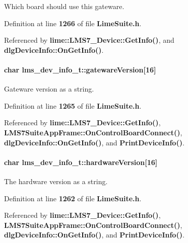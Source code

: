 Which board should use this gateware. 



Definition at line {\bf 1266} of file {\bf Lime\+Suite.\+h}.



Referenced by {\bf lime\+::\+L\+M\+S7\+\_\+\+Device\+::\+Get\+Info()}, and {\bf dlg\+Device\+Info\+::\+On\+Get\+Info()}.

\paragraph[{gateware\+Version}]{\setlength{\rightskip}{0pt plus 5cm}char lms\+\_\+dev\+\_\+info\+\_\+t\+::gateware\+Version[16]}\label{structlms__dev__info__t_a455cf9642472677e00d409476b498d77}


Gateware version as a string. 



Definition at line {\bf 1265} of file {\bf Lime\+Suite.\+h}.



Referenced by {\bf lime\+::\+L\+M\+S7\+\_\+\+Device\+::\+Get\+Info()}, {\bf L\+M\+S7\+Suite\+App\+Frame\+::\+On\+Control\+Board\+Connect()}, {\bf dlg\+Device\+Info\+::\+On\+Get\+Info()}, and {\bf Print\+Device\+Info()}.

\paragraph[{hardware\+Version}]{\setlength{\rightskip}{0pt plus 5cm}char lms\+\_\+dev\+\_\+info\+\_\+t\+::hardware\+Version[16]}\label{structlms__dev__info__t_a46ba3be8cf71a94d33d46126a9257576}


The hardware version as a string. 



Definition at line {\bf 1262} of file {\bf Lime\+Suite.\+h}.



Referenced by {\bf lime\+::\+L\+M\+S7\+\_\+\+Device\+::\+Get\+Info()}, {\bf L\+M\+S7\+Suite\+App\+Frame\+::\+On\+Control\+Board\+Connect()}, {\bf dlg\+Device\+Info\+::\+On\+Get\+Info()}, and {\bf Print\+Device\+Info()}.

